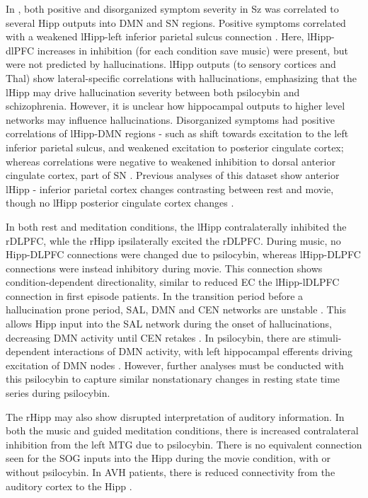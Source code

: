 \documentclass{article}
\begin{document}
In \citet{uscatescu_effective_2021}, both positive and disorganized symptom severity in Sz was correlated to several Hipp outputs into DMN and SN regions. Positive symptoms correlated with a weakened lHipp-left inferior parietal sulcus connection \citep{uscatescu_effective_2021}.  Here, lHipp-dlPFC increases in inhibition (for each condition save music) were present, but were not predicted by hallucinations. lHipp outputs (to sensory cortices and Thal) show lateral-specific correlations with hallucinations, emphasizing that the lHipp may drive hallucination severity between both psilocybin and schizophrenia. However, it is unclear how hippocampal outputs to higher level networks may influence hallucinations. Disorganized symptoms had positive correlations of lHipp-DMN regions - such as shift towards excitation to the left inferior parietal sulcus, and weakened excitation to posterior cingulate cortex; whereas correlations were negative to weakened inhibition to dorsal anterior cingulate cortex, part of SN \citep{uscatescu_effective_2021}. Previous analyses of this dataset show anterior lHipp - inferior parietal cortex changes contrasting between rest and movie, though no lHipp posterior cingulate cortex changes \citep{stoliker_psychedelics_2025}. 

In both rest and meditation conditions, the lHipp contralaterally inhibited the rDLPFC, whle the rHipp ipsilaterally excited the rDLPFC. During music, no Hipp-DLPFC connections were changed due to psilocybin, whereas lHipp-DLPFC connections were instead inhibitory during movie. This connection shows condition-dependent directionality, similar to reduced EC the lHipp-lDLPFC connection in first episode patients\citep{cui_anterior_2015}. In the transition period before a hallucination prone period, SAL, DMN and CEN networks are unstable \citep{lefebvre_network_2016}. This allows Hipp input into the SAL network during the onset of hallucinations, decreasing DMN activity until CEN retakes \citep{lefebvre_network_2016}. In psilocybin, there are stimuli-dependent interactions of DMN activity, with left hippocampal efferents driving excitation of DMN nodes \citep{stoliker_psychedelics_2025}. However, further analyses must be conducted with this psilocybin to capture similar nonstationary changes in resting state time series during psilocybin. 

The rHipp may also show disrupted interpretation of auditory information. In both the music and guided meditation conditions, there is increased contralateral inhibition from the left MTG due to psilocybin. There is no equivalent connection seen for the SOG inputs into the Hipp during the movie condition, with or without psilocybin. In AVH patients, there is reduced connectivity from the auditory cortex to the Hipp \citep{li_abnormal_2017}. 
\end{document}
